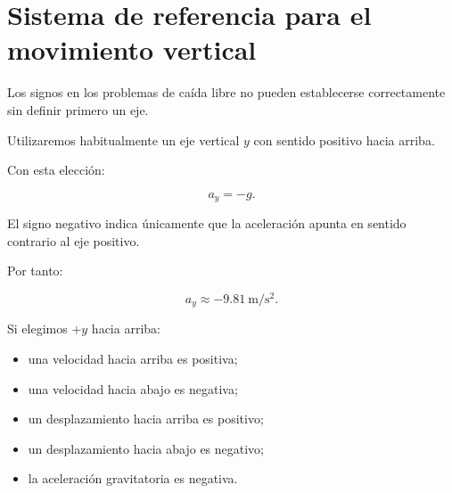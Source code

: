 \section{Sistema de referencia para el movimiento vertical}

Los signos en los problemas de caída libre no pueden establecerse correctamente sin definir primero un eje.

Utilizaremos habitualmente un eje vertical \(y\) con sentido positivo hacia arriba.

\begin{center}
\end{center}

Con esta elección:

\[
\boxed{a_y=-g}.
\]

El signo negativo indica únicamente que la aceleración apunta en sentido contrario al eje positivo.

Por tanto:

\[
\boxed{a_y\approx-\SI{9.81}{\meter\per\second\squared}}.
\]

\begin{interpretacion}
Si elegimos \(+y\) hacia arriba:

\begin{itemize}
    \item una velocidad hacia arriba es positiva;
    \item una velocidad hacia abajo es negativa;
    \item un desplazamiento hacia arriba es positivo;
    \item un desplazamiento hacia abajo es negativo;
    \item la aceleración gravitatoria es negativa.
\end{itemize}
\end{interpretacion}


